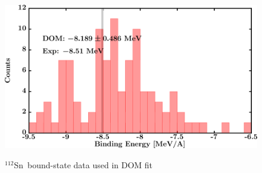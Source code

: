 \documentclass[twocolumn,secnumarabic,amssymb, nobibnotes, aps, prl,
superscriptaddress, nobalancelastpage]{revtex4}
\newcommand{\snTwelve}{\ensuremath{^{112}}S\lowercase{n}}
\begin{document}
\begin{figure}[!htb]
\begin{minipage}{0.4\linewidth}
        \label{DOM_sn112_RMSRadius}
    \end{minipage}
    \begin{minipage}{0.4\linewidth}
        \centering
        \includegraphics[width=\linewidth]{figures/sn112_BE.png}
        \label{DOM_sn112_BE}
    \end{minipage}
    \caption{\snTwelve\ bound-state data used in DOM fit}
    \label{DOM_sn112_structural}
\end{figure}
\end{document}
